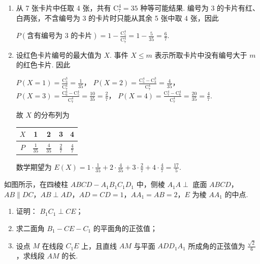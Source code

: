 \begin{solution}
\begin{enumerate}
\item 从 7 张卡片中任取 4 张，共有 \(\mathrm C_7^4=35\) 种等可能结果. 编号为 3 的卡片有红、白两张，不含编号为 3 的卡片时只能从其余 5 张中取 4 张，因此

\(P(\text{含有编号为 3 的卡片})=1-\frac{\mathrm C_5^4}{\mathrm C_7^4}=1-\frac{5}{35}=\frac{6}{7}\).

\item 设红色卡片编号的最大值为 \(X\). 事件 \(X\leqslant m\) 表示所取卡片中没有编号大于 \(m\) 的红色卡片. 因此

\(P(X=1)=\frac{\mathrm C_3^3}{\mathrm C_7^4}=\frac{1}{35}\)，
\(P(X=2)=\frac{\mathrm C_5^4-\mathrm C_3^3}{\mathrm C_7^4}=\frac{4}{35}\)，
\(P(X=3)=\frac{\mathrm C_6^4-\mathrm C_5^4}{\mathrm C_7^4}=\frac{10}{35}=\frac{2}{7}\)，
\(P(X=4)=\frac{\mathrm C_7^4-\mathrm C_6^4}{\mathrm C_7^4}=\frac{20}{35}=\frac{4}{7}\).

故 \(X\) 的分布列为

\begin{center}
\begin{tabular}{c|cccc}
\(X\) & 1 & 2 & 3 & 4 \\
\hline
\(P\) & \(\frac{1}{35}\) & \(\frac{4}{35}\) & \(\frac{2}{7}\) & \(\frac{4}{7}\)
\end{tabular}
\end{center}

数学期望为 \(E(X)=1\cdot\frac{1}{35}+2\cdot\frac{4}{35}+3\cdot\frac{2}{7}+4\cdot\frac{4}{7}=\frac{17}{5}\).
\end{enumerate}
\end{solution}

\begin{problem}
如图所示，在四棱柱 \(ABCD - A_{1}B_{1}C_{1}D_{1}\) 中，侧棱 \(A_{1}A \perp\) 底面 \(ABCD\)，\(AB \parallel DC\)，\(AB \perp AD\)，\(AD = CD = 1\)，\(AA_{1} = AB = 2\)，\(E\) 为棱 \(AA_{1}\) 的中点.
\begin{enumerate}
\item 证明： \( B_{1}C_{1}\perp CE \)；
\item 求二面角 \(B_{1} - CE - C_{1}\) 的平面角的正弦值；
\item 设点 \(M\) 在线段 \(C_{1}E\) 上，且直线 \(AM\) 与平面 \(ADD_{1}A_{1}\) 所成角的正弦值为 \( \frac{\sqrt{2}}{6} \)，求线段 \(AM\) 的长.
\end{enumerate}
\end{problem}


